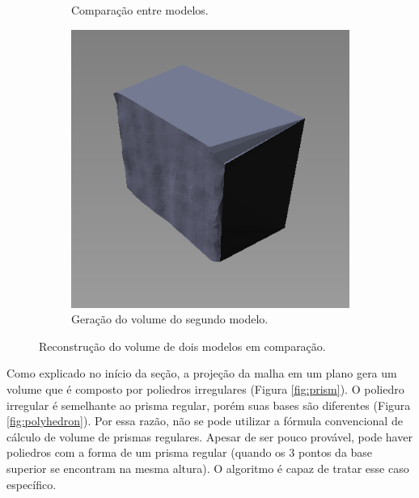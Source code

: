 \begin{figure}[H]
\begin{subfigure}[t]{0.325\textwidth}
        \caption{Comparação entre modelos.}
        \label{fig:projection2}
    \end{subfigure}
    \begin{subfigure}[t]{0.325\textwidth}
        \includegraphics[width=\textwidth]{dados/figuras/projection3.png}
        \caption{Geração do volume do segundo modelo.}
        \label{fig:projection3}
    \end{subfigure}
    \caption{Reconstrução do volume de dois modelos em comparação.}
    \label{fig:projection}
\end{figure}

Como explicado no início da seção, a projeção da malha em um plano gera um volume que é composto por poliedros irregulares (Figura \ref{fig:prism}). O poliedro irregular é semelhante ao prisma regular, porém suas bases são diferentes (Figura \ref{fig:polyhedron}). Por essa razão, não se pode utilizar a fórmula convencional de cálculo de volume de prismas regulares.  
Apesar de ser pouco provável, pode haver poliedros com a forma de um prisma regular (quando os 3 pontos da base superior se encontram na mesma altura). 
O algoritmo é capaz de tratar esse caso específico.

